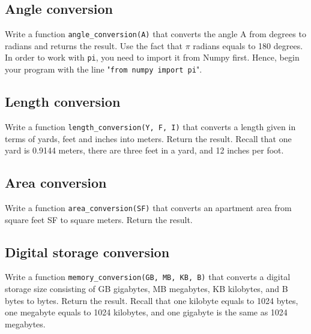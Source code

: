 
\subsection{Angle conversion}

Write a function {\tt angle\_conversion(A)} that converts the angle A
from degrees to radians and returns the result. Use the fact that $\pi$
radians equals to 180 degrees. In order to work with {\tt pi}, you need to 
import it from Numpy first. Hence, begin your program with the line 
"{\tt from numpy import pi}".


\subsection{Length conversion}

Write a function {\tt length\_conversion(Y, F, I)} that converts a length given
in terms of yards, feet and inches into meters. Return the result. Recall 
that one yard is 0.9144 meters, there are three feet in a yard, and 
12 inches per foot.


\subsection{Area conversion}

Write a function {\tt area\_conversion(SF)} that converts an apartment 
area from square feet SF to square meters. Return the result. 


\subsection{Digital storage conversion}

Write a function {\tt memory\_conversion(GB, MB, KB, B)} that converts a digital storage 
size consisting of GB gigabytes, MB megabytes, KB kilobytes, and 
B bytes to bytes. Return the result. Recall that one kilobyte 
equals to 1024 bytes, one megabyte equals to 1024 kilobytes, and 
one gigabyte is the same as 1024 megabytes.


